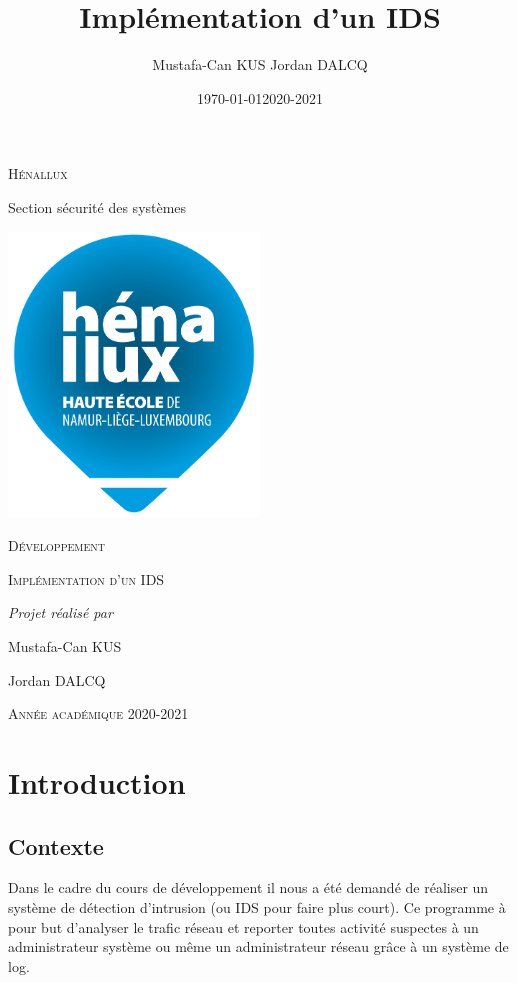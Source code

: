 \documentclass[a4paper]{report}
\date{\today}
\title{}
\begin{document}
\begin{LaTex}
\begin{titlepage}
\centering
  {\scshape Hénallux\par\vspace{0.2cm} Section sécurité des systèmes\par \vspace{0.2cm}}
  \vspace{1cm}
  \includegraphics[width=0.5\textwidth]{img/school}\par\vspace{1cm}
  {\scshape \LARGE Développement \par}
  \vspace{0.2cm}
	{\scshape \Large Implémentation d'un IDS\par}
  \vspace{3cm}
  {\Large\itshape Projet réalisé par \par\vspace{0.5cm} Mustafa-Can KUS \par Jordan DALCQ \par}
  \vfill
  \scshape Année académique 2020-2021 
  \title{Implémentation d'un IDS}
  \author{Mustafa-Can KUS Jordan DALCQ}
  \date{2020-2021}
\end{titlepage}

\pagestyle{headings}
\end{LaTex}
\tableofcontents

\part{Introduction}
\label{sec:orgae3e221}
\chapter{Contexte}
\label{sec:org4a86ad6}
Dans le cadre du cours de développement il nous a été demandé de réaliser un système de détection d'intrusion (ou IDS pour faire plus court).
Ce programme à pour but d'analyser le trafic réseau et reporter toutes activité suspectes à un administrateur système ou même un administrateur réseau
grâce à un système de log.
\end{document}

